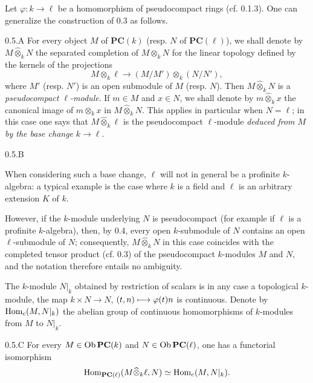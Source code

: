 Let $\varphi:k\to\ell$ be a homomorphism of pseudocompact rings (cf. 0.1.3). One can generalize the construction of 0.3 as follows.
\begin{definition}{0.5.A}\label{VIIB.0.5.A}
For every object $M$ of $\mathbf{PC}(k)$ (resp. $N$ of $\mathbf{PC}(\ell)$), we shall denote by $M\widehat\otimes_k N$ the separated completion of $M\otimes_k N$ for the linear topology defined by the kernels of the projections
\[
M\otimes_k\ell\to(M/M')\otimes_k(N/N'),
\]
where $M'$ (resp. $N'$) is an open submodule of $M$ (resp. $N$). Then $M\widehat\otimes_k N$ is a \emph{pseudocompact $\ell$-module}. If $m\in M$ and $x\in N$, we shall denote by $m\widehat\otimes_k x$ the canonical image of $m\otimes_k x$ in $M\widehat\otimes_k N$.
This applies in particular when $N=\ell$; in this case one says that $M\widehat\otimes_k\ell$ is the pseudocompact $\ell$-module \emph{deduced from $M$ by the base change} $k\to\ell$.
\end{definition}
\begin{remarks}{0.5.B}\label{VIIB.0.5.B}
\begin{enumeratei}
\item When considering such a base change, $\ell$ will not in general be a profinite $k$-algebra: a typical example is the case where $k$ is a field and $\ell$ is an arbitrary extension $K$ of $k$.
\item However, if the $k$-module underlying $N$ is pseudocompact (for example if $\ell$ is a profinite $k$-algebra), then, by 0.4, every open $k$-submodule of $N$ contains an open $\ell$-submodule of $N$; consequently, $M\widehat\otimes_k N$ in this case coincides with the completed tensor product (cf. 0.3) of the pseudocompact $k$-modules $M$ and $N$, and the notation therefore entails no ambiguity.
\end{enumeratei}
\end{remarks}
The $k$-module $N|_k$ obtained by restriction of scalars is in any case a topological $k$-module, \ie the map $k\times N\to N$, $(t,n)\longmapsto\varphi(t)n$ is continuous. Denote by $\operatorname{Hom}_c(M,N|_k)$ the abelian group of continuous homomorphisms of $k$-modules from $M$ to $N|_k$.
\begin{proposition}{0.5.C}\label{VIIB.0.5.C}
For every $M\in\operatorname{Ob}\mathbf{PC}(k)$ and $N\in\operatorname{Ob}\mathbf{PC}(\ell)$, one has a functorial isomorphism
\[
\operatorname{Hom}_{\mathbf{PC}(\ell)}(M\widehat\otimes_k\ell,N)\simeq\operatorname{Hom}_c(M,N|_k).
\]
\end{proposition}
